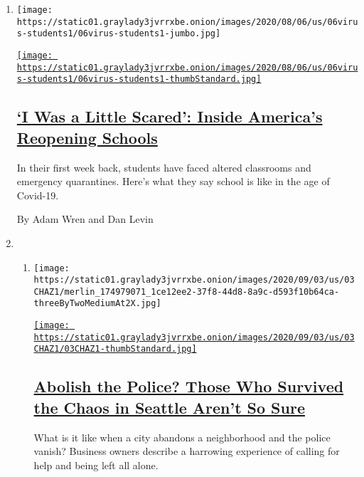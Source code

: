 \begin{enumerate}
\def\labelenumi{\arabic{enumi}.}
\item
  \texttt{[image: https://static01.graylady3jvrrxbe.onion/images/2020/08/06/us/06virus-students1/06virus-students1-jumbo.jpg]}

  \href{/2020/08/06/us/coronavirus-students.html}{\texttt{[image: https://static01.graylady3jvrrxbe.onion/images/2020/08/06/us/06virus-students1/06virus-students1-thumbStandard.jpg]}}

  \hypertarget{i-was-a-little-scared-inside-americas-reopening-schools}{%
  \subsection{\texorpdfstring{\href{/2020/08/06/us/coronavirus-students.html}{`I
  Was a Little Scared': Inside America's Reopening
  Schools}}{`I Was a Little Scared': Inside America's Reopening Schools}}\label{i-was-a-little-scared-inside-americas-reopening-schools}}

  In their first week back, students have faced altered classrooms and
  emergency quarantines. Here's what they say school is like in the age
  of Covid-19.

  By Adam Wren and Dan Levin
\item
  \begin{enumerate}
  \def\labelenumii{\arabic{enumii}.}
  \item
    \texttt{[image: https://static01.graylady3jvrrxbe.onion/images/2020/09/03/us/03CHAZ1/merlin\_174979071\_1ce12ee2-37f8-44d8-8a9c-d593f10b64ca-threeByTwoMediumAt2X.jpg]}

    \href{/2020/08/07/us/defund-police-seattle-protests.html}{\texttt{[image: https://static01.graylady3jvrrxbe.onion/images/2020/09/03/us/03CHAZ1/03CHAZ1-thumbStandard.jpg]}}

    \hypertarget{abolish-the-police-those-who-survived-the-chaos-in-seattle-arent-so-sure}{%
    \subsection{\texorpdfstring{\href{/2020/08/07/us/defund-police-seattle-protests.html}{Abolish
    the Police? Those Who Survived the Chaos in Seattle Aren't So
    Sure}}{Abolish the Police? Those Who Survived the Chaos in Seattle Aren't So Sure}}\label{abolish-the-police-those-who-survived-the-chaos-in-seattle-arent-so-sure}}

    What is it like when a city abandons a neighborhood and the police
    vanish? Business owners describe a harrowing experience of calling
    for help and being left all alone.


\end{enumerate}
\end{enumerate}

